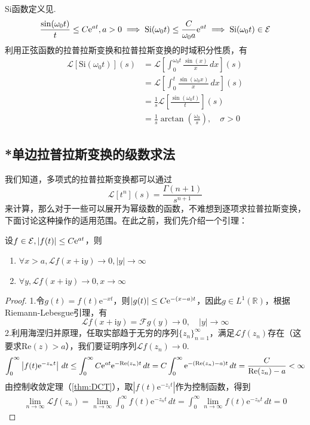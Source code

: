 \begin{example}[正弦积分函数]
    Si函数定义见.
    $$\frac{\sin(\omega_0 t)}{t}\leq C\mathrm{e}^{a t},a>0\implies \mathrm{Si}(\omega_0 t)\leq \frac{C}{\omega_0 a}\mathrm{e}^{a t}\implies \mathrm{Si}(\omega_0 t)\in\mathcal{E}$$
    利用正弦函数的拉普拉斯变换和拉普拉斯变换的时域积分性质，有
    \begin{align*}
        \mathcal{L} [\mathrm{Si}(\omega_0 t)](s)&=\mathcal{L} \left[\int_0^{\omega_0 t} \frac{\sin(x)}{x}\,dx\right](s)\\
        &=\mathcal{L} \left[\int_0^{t} \frac{\sin(\omega_0 x)}{x}\,dx\right](s)\\
        &=\frac{1}{s}\mathcal{L} \left[\frac{\sin(\omega_0 t)}{t}\right](s)\\
        &=\frac{1}{s}\arctan\left(\frac{\omega_0}{s}\right),\quad \sigma>0
    \end{align*}    
\end{example}

\subsection{*单边拉普拉斯变换的级数求法}\label{sub:laplace_by_series}
我们知道，多项式的拉普拉斯变换都可以通过$$\mathcal{L} [t^n](s)=\dfrac{\Gamma(n+1)}{s^{n+1}}$$来计算，那么对于一些可以展开为幂级数的函数，不难想到逐项求拉普拉斯变换，下面讨论这种操作的适用范围。在此之前，我们先介绍一个引理：
\begin{lemma}
    设$f\in\mathcal{E} ,|f(t)|\leq C\mathrm{e}^{at}$，则\begin{enumerate}
        \item $\forall x>a,\mathcal{L} f(x+\mathrm{i}y)\to 0,|y|\to\infty$
        \item $\forall y,\mathcal{L} f(x+\mathrm{i}y)\to 0,x\to\infty$
    \end{enumerate}
\end{lemma}
\begin{proof}
    1.令$g(t)=f(t)\mathrm{e}^{-x t}$，则$|g(t)|\leq C\mathrm{e}^{-(x-a)t}$，因此$g\in L^1(\mathbb{R} )$，根据Riemann-Lebesgue引理，有
    \[\mathcal{L} f(x+\mathrm{i}y)=\mathcal{F} g(y)\to 0,\quad |y|\to\infty\]
    2.利用海涅归并原理，任取实部趋于无穷的序列$\{z_n\}_{n=1}^\infty$，满足$\mathcal{L} f(z_n)$存在（这要求$\mathrm{Re}(z)>a$），我们要证明序列$\mathcal{L} f(z_n)\to 0$.
    $$\int_{0}^{\infty}\left|f(t)\mathrm{e}^{-z_n t}\right|\,dt\leq \int_0^{\infty}C\mathrm{e}^{at}\mathrm{e}^{-\mathrm{Re}(z_n) t}\,dt=C\int_0^{\infty}\mathrm{e}^{-(\mathrm{Re}(z_n)-a)t}\,dt=\frac{C}{\mathrm{Re}(z_n)-a}<\infty$$
    由控制收敛定理（\cref{thm:DCT}），取$\left|f(t)\mathrm{e}^{-z_1 t}\right|$作为控制函数，得到
    \begin{align*}
        \lim_{n\to\infty}\mathcal{L} f(z_n)=\lim_{n\to\infty}\int_0^{\infty}f(t)\mathrm{e}^{-z_n t}\,dt=\int_0^{\infty}\lim_{n\to\infty}f(t)\mathrm{e}^{-z_n t}\,dt=0
    \end{align*}
\end{proof}

